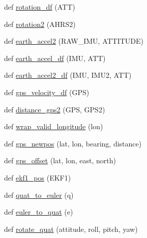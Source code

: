 \begin{DoxyCompactItemize}
\item 
def \hyperlink{namespacepymavlink_1_1mavextra_a8d3483c735e242ad8bb46001dae2284a}{rotation\+\_\+df} (A\+TT)
\item 
def \hyperlink{namespacepymavlink_1_1mavextra_abaf31a27857e3a949ad5166c35d11773}{rotation2} (A\+H\+R\+S2)
\item 
def \hyperlink{namespacepymavlink_1_1mavextra_a2e8ffaaf018bdd21bcc0dac891e88407}{earth\+\_\+accel2} (R\+A\+W\+\_\+\+I\+MU, A\+T\+T\+I\+T\+U\+DE)
\item 
def \hyperlink{namespacepymavlink_1_1mavextra_a51880208595cc665f7dd2af3e44390f2}{earth\+\_\+accel\+\_\+df} (I\+MU, A\+TT)
\item 
def \hyperlink{namespacepymavlink_1_1mavextra_a40df15a3e1e1a67b2bb53a0b73d48d63}{earth\+\_\+accel2\+\_\+df} (I\+MU, I\+M\+U2, A\+TT)
\item 
def \hyperlink{namespacepymavlink_1_1mavextra_a283e68b9dcd503bfedb6431c4815660c}{gps\+\_\+velocity\+\_\+df} (G\+PS)
\item 
def \hyperlink{namespacepymavlink_1_1mavextra_a4967f5a9f9d809005b0c7ec3ee25415c}{distance\+\_\+gps2} (G\+PS, G\+P\+S2)
\item 
def \hyperlink{namespacepymavlink_1_1mavextra_ab34a549c8b911b6455f2d641af495192}{wrap\+\_\+valid\+\_\+longitude} (lon)
\item 
def \hyperlink{namespacepymavlink_1_1mavextra_addedb30f8a88b98176fe226bfed8aaad}{gps\+\_\+newpos} (lat, lon, bearing, distance)
\item 
def \hyperlink{namespacepymavlink_1_1mavextra_ac5d6283932b9abee57818ce1c5a8b2c2}{gps\+\_\+offset} (lat, lon, east, north)
\item 
def \hyperlink{namespacepymavlink_1_1mavextra_a0982fb72ae1fd1006e089debf6b98440}{ekf1\+\_\+pos} (E\+K\+F1)
\item 
def \hyperlink{namespacepymavlink_1_1mavextra_a60cc24d55dd20230db0faa61038e6cf7}{quat\+\_\+to\+\_\+euler} (q)
\item 
def \hyperlink{namespacepymavlink_1_1mavextra_afe052544879bef855464ba48b3fe55f6}{euler\+\_\+to\+\_\+quat} (e)
\item 
def \hyperlink{namespacepymavlink_1_1mavextra_a44f4f12a741cc819b9197e09e78b4e78}{rotate\+\_\+quat} (attitude, roll, pitch, yaw)
\end{DoxyCompactItemize}
